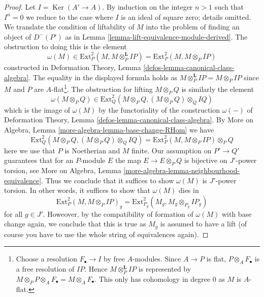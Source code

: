 \documentclass[10pt,a4paper]{amsart}
\theoremstyle{plain}
\theoremstyle{definition}
\theoremstyle{remark}
\numberwithin{equation}{subsection}
\def\Ker{\mathop{\mathrm{Ker}}}
\begin{document}
\begin{proof}
Let $I = \Ker(A' \to A)$. By induction on the integer $n > 1$
such that $I^n = 0$ we reduce to the case where $I$ is an ideal
of square zero; details omitted.
We translate the condition of liftability of
$M$ into the problem of finding an object of $D^-(P')$ as in
Lemma \ref{lemma-lift-equivalence-module-derived}.
The obstruction to doing this is the element
$$
\omega(M) \in \text{Ext}^2_P(M, M \otimes_P^\mathbf{L} IP) =
\text{Ext}^2_P(M, M \otimes_P IP)
$$
constructed in
Deformation Theory, Lemma \ref{defos-lemma-canonical-class-algebra}.
The equality in the displayed formula holds as
$M \otimes_P^\mathbf{L} IP = M \otimes_P IP$
since $M$ and $P$ are $A$-flat\footnote{Choose a resolution
$F_\bullet \to I$ by free $A$-modules. Since $A \to P$ is flat,
$P \otimes_A F_\bullet$ is a free resolution of $IP$.
Hence $M \otimes_P^\mathbf{L} IP$ is represented by
$M \otimes_P P \otimes_A F_\bullet = M \otimes_A F_\bullet$.
This only has cohomology in degree $0$ as $M$ is $A$-flat.}.
The obstruction for lifting $M \otimes_P Q$ is similarly
the element
$$
\omega(M \otimes_P Q) \in
\text{Ext}^2_Q(M \otimes_P Q, (M \otimes_P Q) \otimes_Q IQ)
$$
which is the image of $\omega(M)$ by the functoriality
of the construction $\omega(-)$ of
Deformation Theory, Lemma \ref{defos-lemma-canonical-class-algebra}.
By More on Algebra, Lemma \ref{more-algebra-lemma-base-change-RHom}
we have
$$
\text{Ext}^2_Q(M \otimes_P Q, (M \otimes_P Q) \otimes_Q IQ) =
\text{Ext}^2_P(M, M \otimes_P IP) \otimes_P Q
$$
here we use that $P$ is Noetherian and $M$ finite.
Our assumption on $P' \to Q'$ guarantees that for an $P$-module $E$
the map $E \to E \otimes_P Q$ is bijective on $J'$-power torsion, see
More on Algebra, Lemma
\ref{more-algebra-lemma-neighbourhood-equivalence}.
Thus we conclude that it suffices to show $\omega(M)$
is $J'$-power torsion. In other words, it suffices to show that
$\omega(M)$ dies in
$$
\text{Ext}^2_P(M, M \otimes_P IP)_g =
\text{Ext}^2_{P_g}(M_g, M_g \otimes_{P_g} IP_g)
$$
for all $g \in J'$. Howeover, by the compatibility of formation of $\omega(M)$
with base change again, we conclude that this is true as $M_g$
is assumed to have a lift (of course you have to use the whole
string of equivalences again).
\end{proof}
\end{document}
